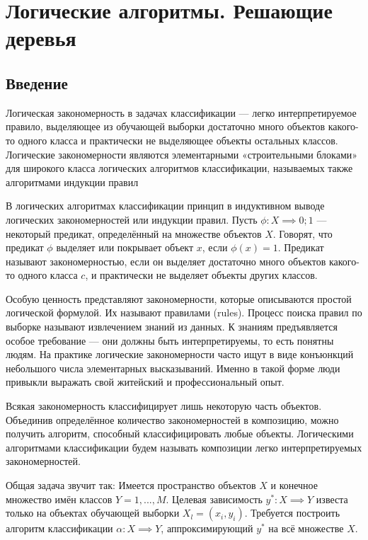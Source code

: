 \section{Логические алгоритмы. Решающие деревья}

\subsection{Введение}

Логическая закономерность в задачах классификации — легко интерпретируемое правило, выделяющее из обучающей выборки достаточно много объектов какого-то одного класса и практически не выделяющее объекты остальных классов. Логические закономерности являются элементарными «строительными блоками» для широкого класса логических алгоритмов классификации, называемых также алгоритмами индукции правил 

В логических алгоритмах классификации принцип в индуктивном выводе логических закономерностей или индукции правил. Пусть $\phi:X \implies {0;1}$ — некоторый предикат, определённый на множестве объектов $X$. Говорят, что предикат $\phi$ выделяет или покрывает объект $x$, если $\phi(x) = 1$. Предикат называют закономерностью, если он выделяет достаточно много объектов какого-то одного класса $c$, и практически не выделяет объекты других классов. 

Особую ценность представляют закономерности, которые описываются простой логической формулой. Их называют правилами (rules). Процесс поиска правил по выборке называют извлечением знаний из данных. К знаниям предъявляется особое требование — они должны быть интерпретируемы, то есть понятны людям. На практике логические закономерности часто ищут в виде конъюнкций небольшого числа элементарных высказываний. Именно в такой форме люди привыкли выражать свой житейский и профессиональный опыт.

Всякая закономерность классифицирует лишь некоторую часть объектов. Объединив определённое количество закономерностей в композицию, можно получить алгоритм, способный классифицировать любые объекты. Логическими алгоритмами классификации будем называть композиции легко интерпретируемых закономерностей. 

Общая задача звучит так:
Имеется пространство объектов $X$ и конечное множество имён классов $Y= {1,...,M}$. Целевая зависимость $y^{*}: X \implies Y$ известа только на объектах обучающей выборки $X_l=(x_i,y_i)$.  Требуется построить алгоритм классификации $\alpha: X \implies Y$, аппроксимирующий $y^{*}$ на всё множестве $X$.

